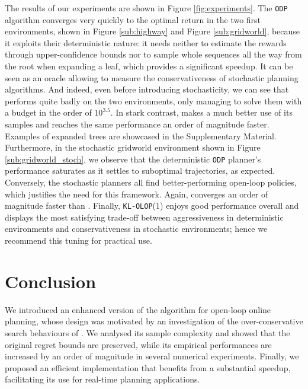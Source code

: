 \documentclass[runningheads]{llncs}
\begin{document}
The results of our experiments are shown in Figure \ref{fig:experiments}. The \texttt{ODP} algorithm converges very quickly to the optimal return in the two first environments, shown in Figure \ref{sub:highway} and Figure \ref{sub:gridworld}, because it exploits their deterministic nature: it needs neither to estimate the rewards through upper-confidence bounds nor to sample whole sequences all the way from the root when expanding a leaf, which provides a significant speedup. It can be seen as an oracle allowing to measure the conservativeness of stochastic planning algorithms. And indeed, even before introducing stochasticity, we can see that \OLOP performs quite badly on the two environments, only managing to solve them with a budget in the order of $10^{3.5}$. In stark contrast, \KLOLOP makes a much better use of its samples and reaches the same performance an order of magnitude faster. Examples of expanded trees are showcased in the Supplementary Material. Furthermore, in the stochastic gridworld environment shown in Figure \ref{sub:gridworld_stoch}, we observe that the deterministic \texttt{ODP} planner's performance saturates as it settles to suboptimal trajectories, as expected. Conversely, the stochastic planners all find better-performing open-loop policies, which justifies the need for this framework. Again, \KLOLOP converges an order of magnitude faster than \OLOP. Finally, \texttt{KL-OLOP}(1) enjoys good performance overall and displays the most satisfying trade-off between aggressiveness in deterministic environments and conservativeness in stochastic environments; hence we recommend this tuning for practical use.

\section{Conclusion}

We introduced an enhanced version of the \OLOP algorithm for open-loop online planning, whose design was motivated by an investigation of the over-conservative search behaviours of \OLOP. We analysed its sample complexity and showed that the original regret bounds are preserved, while its empirical performances are increased by an order of magnitude in several numerical experiments. Finally, we proposed an efficient implementation that benefits from a substantial speedup, facilitating its use for real-time planning applications.
\end{document}
